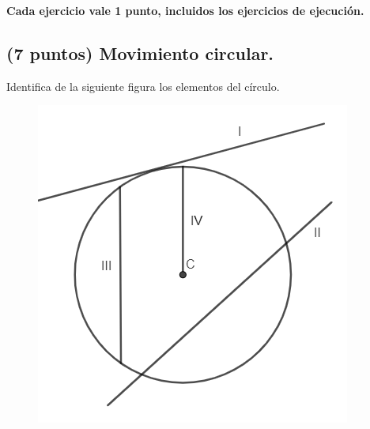 \documentclass[12pt, letter]{exam}
\begin{document}


\setcounter{page}{3}

\begin{center}
\textbf{Cada ejercicio vale 1 punto, incluidos los ejercicios de ejecución.}
\end{center}

\begin{questions}

    \section{(7 puntos) Movimiento circular.}

    \question Identifica de la siguiente figura los elementos del círculo.
    \begin{figure}[H]
        \centering
        \includegraphics[scale=0.8]{Elementos_Circulo_01.png}
    \end{figure}
    \begin{multicols}{2}
\end{multicols}
\end{questions}
\end{document}
